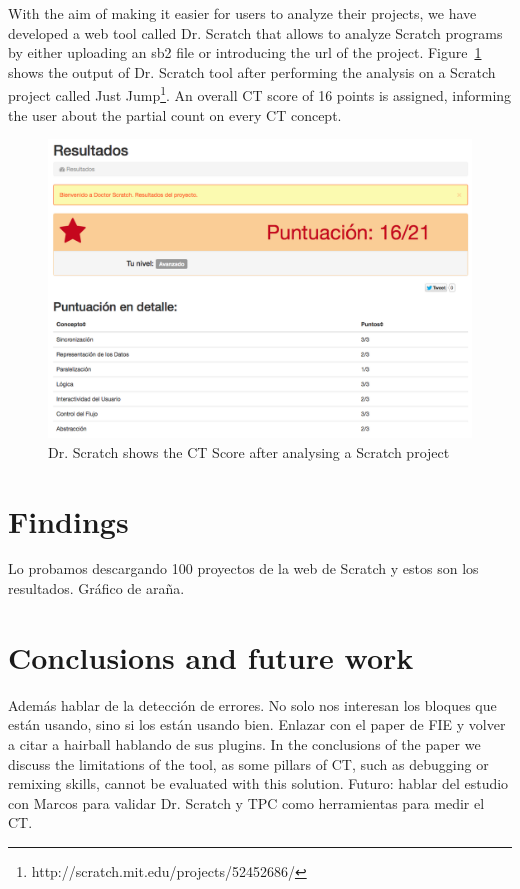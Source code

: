 \documentclass[a4paper,11pt]{article}
\begin{document}
With the aim of making it easier for users to analyze their projects, we have developed a web tool called Dr. Scratch that allows to analyze Scratch programs by either uploading an sb2 file or introducing the url of the project. Figure~\ref{fig:drscratch} shows the output of Dr. Scratch tool after performing the analysis on a Scratch project called Just Jump\footnote{http://scratch.mit.edu/projects/52452686/}. An overall CT score of 16 points is assigned, informing the user about the partial count on every CT concept.
\begin{figure}
  \centering
    \includegraphics[width=13cm]{img/results.png}
    \caption{Dr. Scratch shows the CT Score after analysing a Scratch project}
    \label{fig:drscratch}
\end{figure}

\section{Findings}
\label{sec:findings}

Lo probamos descargando 100 proyectos de la web de Scratch y estos son los resultados. Gráfico de araña.

\section{Conclusions and future work}
\label{sec:conclusions}
Además hablar de la detección de errores. No solo nos interesan los bloques que están usando, sino si los están usando bien. Enlazar con el paper de FIE y volver a citar a hairball hablando de sus plugins.
In the conclusions of the paper we discuss the limitations of the tool, as some pillars of CT, such as debugging or remixing skills, cannot be evaluated with this solution.
Futuro: hablar del estudio con Marcos para validar Dr. Scratch y TPC como herramientas para medir el CT.
\newpage


\end{document}
